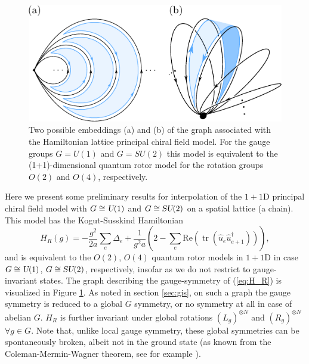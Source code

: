 \documentclass[twocolumn,lengthcheck,superscriptaddress]{revtex4-1}
\newcommand{\tr}{\operatorname{tr}}
\def\su2{\textsl{SU}(2)}
\def\uone{\textsl{U}(1)}
\theoremstyle{definition}
\theoremstyle{remark}
\begin{document}
\begin{figure}[b]
  \includegraphics{petal_earring_text.pdf}
  \caption{\label{fig:earring} Two possible embeddings (a) and (b) of the graph associated with the
           Hamiltonian lattice principal chiral field model.
           For the gauge groups $G=U(1)$ and $G=SU(2)$ this model is equivalent to the
           (1+1)-dimensional quantum rotor model
           for the rotation groups $O(2)$ and $O(4)$, respectively.
           }
\end{figure}

Here we present some preliminary results for interpolation of the $1+1$D principal chiral field model with $G \cong \uone$ and $G \cong \su2$ on a spatial lattice (a chain). This model has the Kogut-Susskind Hamiltonian
\begin{equation} \label{eq:H_R}
	H_R(g) = -\frac{g^2}{2 a} \sum_e \Delta_e + \frac{1}{g^2 a}\left( 2 - \sum_e \text{Re}(\tr (\widehat{u}_e \widehat{u}_{e+1}^\dagger)) \right),
\end{equation}
and is equivalent to the $O(2)$, $O(4)$ quantum rotor models in $1+1$D \cite{sachdev:2011a} in case $G \cong \uone$, $G \cong \su2$, respectively, insofar as we do not restrict to gauge-invariant states. The graph describing the gauge-symmetry of (\ref{eq:H_R}) is visualized in Figure \ref{fig:earring}.  As noted in section \ref{sec:gis}, on such a graph the gauge symmetry is reduced to a global $G$ symmetry, or no symmetry at all in case of abelian $G$. $H_R$ is further invariant under global rotations $(L_g)^{\otimes N}$ and $(R_g)^{\otimes N}$ $\forall g \in G$. Note that, unlike local gauge symmetry, these global symmetries can be spontaneously broken, albeit not in the ground state (as known from the Coleman-Mermin-Wagner theorem, see for example \cite{peskin:1995a}).
\end{document}
